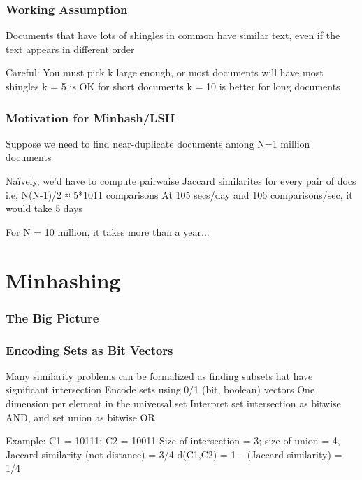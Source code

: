 \documentclass[svgnames]{beamer}
\begin{document}
  
\begin{frame} \frametitle{Working Assumption}

Documents that have lots of shingles in common have similar text, even if the text appears in different order

Careful: You must pick k large enough, or most documents will have most shingles
   k = 5 is OK for short documents
   k = 10 is better for long documents

\end{frame}

  
\begin{frame} \frametitle{Motivation for Minhash/LSH}

Suppose we need to find near-duplicate documents among N=1 million documents

Naïvely, we’d have to compute pairwaise Jaccard similarites for every pair of docs
  i.e, N(N-1)/2 ≈ 5*1011 comparisons
  At 105 secs/day and 106 comparisons/sec, it would take 5 days

For N = 10 million, it takes more than a year...

\end{frame}

\section{Minhashing}

  
\begin{frame} \frametitle{The Big Picture}


\end{frame}

  
\begin{frame} \frametitle{Encoding Sets as Bit Vectors}

Many similarity problems can be formalized as finding subsets hat have significant intersection
  Encode sets using 0/1 (bit, boolean) vectors
  One dimension per element in the universal set
  Interpret set intersection as bitwise AND, and set union as bitwise OR

Example: C1 = 10111; C2 = 10011
  Size of intersection = 3; size of union = 4, Jaccard similarity (not distance) = 3/4
  d(C1,C2) = 1 – (Jaccard similarity) = 1/4
  
\end{frame}
\end{document}
